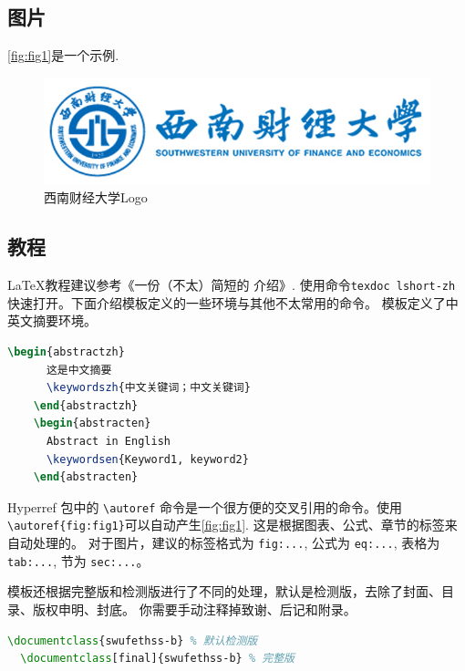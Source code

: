   \subsection{图片}
  \autoref{fig:fig1}是一个示例.

  \begin{figure}[htbp]
      \centering
      \includegraphics{swufe-Logo/opaque.png}
      \caption{西南财经大学Logo}
      \label{fig:fig1}
  \end{figure}
  \subsection{教程}
  \LaTeX 教程建议参考《一份（不太）简短的 \LaTeXe 介绍》. 使用命令\verb"texdoc lshort-zh" 快速打开。下面介绍模板定义的一些环境与其他不太常用的命令。  
  模板定义了中英文摘要环境。
  \begin{lstlisting}[language=TeX]
    \begin{abstractzh}
      这是中文摘要
      \keywordszh{中文关键词；中文关键词}
    \end{abstractzh}
    \begin{abstracten}
      Abstract in English
      \keywordsen{Keyword1, keyword2}
    \end{abstracten}
  \end{lstlisting}
Hyperref 包中的 \verb"\autoref" 命令是一个很方便的交叉引用的命令。使用 \verb"\autoref{fig:fig1}"可以自动产生\autoref{fig:fig1}. 这是根据图表、公式、章节的标签来自动处理的。 对于图片，建议的标签格式为 \verb"fig:...", 公式为 \verb"eq:...", 表格为 \verb"tab:...", 节为 \verb"sec:..."。

模板还根据完整版和检测版进行了不同的处理，默认是检测版，去除了封面、目录、版权申明、封底。 你需要手动注释掉致谢、后记和附录。
\begin{lstlisting}[language=TeX]
  \documentclass{swufethss-b} % 默认检测版
  \documentclass[final]{swufethss-b} % 完整版
\end{lstlisting}